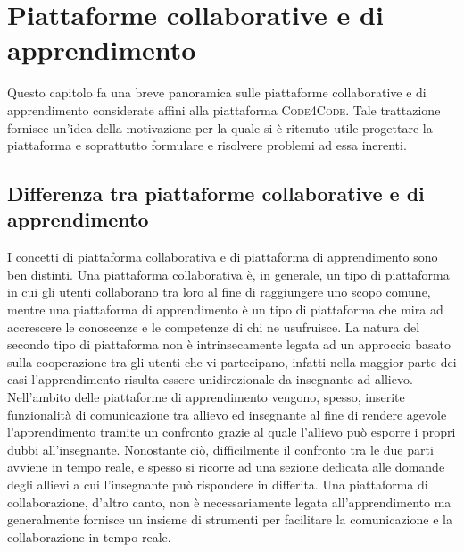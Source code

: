 \chapter{Piattaforme collaborative e di apprendimento} %
%
\begin{citazione}
Questo capitolo fa una breve panoramica sulle piattaforme collaborative e di apprendimento considerate affini alla piattaforma \textsc{Code4Code}. Tale trattazione fornisce un'idea della motivazione per la quale si è ritenuto utile progettare la piattaforma e soprattutto formulare e risolvere problemi ad essa inerenti.
\end{citazione}
\newpage

\section{Differenza tra piattaforme collaborative e di apprendimento} %
I concetti di piattaforma collaborativa e di piattaforma di apprendimento sono ben distinti. Una piattaforma collaborativa è, in generale, un tipo di piattaforma in cui gli utenti collaborano tra loro al fine di raggiungere uno scopo comune, mentre una piattaforma di apprendimento è un tipo di piattaforma che mira ad accrescere le conoscenze e le competenze di chi ne usufruisce. La natura del secondo tipo di piattaforma non è intrinsecamente legata ad un approccio basato sulla cooperazione tra gli utenti che vi partecipano, infatti nella maggior parte dei casi l'apprendimento risulta essere unidirezionale da insegnante ad allievo. Nell'ambito delle piattaforme di apprendimento vengono, spesso, inserite funzionalità di comunicazione tra allievo ed insegnante al fine di rendere agevole l'apprendimento tramite un confronto grazie al quale l'allievo può esporre i propri dubbi all'insegnante. Nonostante ciò, difficilmente il confronto tra le due parti avviene in tempo reale, e spesso si ricorre ad una sezione dedicata alle domande degli allievi a cui l'insegnante può rispondere in differita. Una piattaforma di collaborazione, d'altro canto, non è necessariamente legata all'apprendimento ma generalmente fornisce un insieme di strumenti per facilitare la comunicazione e la collaborazione in tempo reale.  
